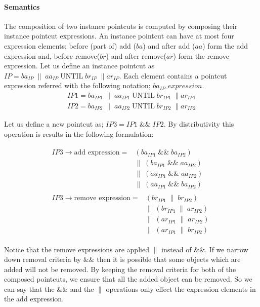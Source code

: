 \documentclass{llncs}
\begin{document}
\paragraph{Semantics}
The composition of two instance pointcuts is computed by composing their instance pointcut expressions.
An instance pointcut can have at most four expression elements; before (part of) add ($ba$) and after add ($aa$) form the add expression and, before remove($br$) and after remove($ar$) form the remove expression. Let us define an instance pointcut as $IP = ba_{IP}\;\|\;aa_{IP}\;\textrm{UNTIL}\;br_{IP}\;\| ar_{IP}$. Each element contains a pointcut expression referred with the following notation; $ba_{IP}\_expression$. 
\begin{align}
	IP1 = ba_{IP1}\;\|\;aa_{IP1}\;\textrm{UNTIL}\;br_{IP1}\;\| ar_{IP1} 
\label{i1}	\\
	IP2 = ba_{IP2}\;\|\;aa_{IP2}\;\textrm{UNTIL}\;br_{IP2}\;\| ar_{IP2}
\label{i2}
\end{align}

Let us define a new pointcut as; $IP3 = IP1\;\textrm{\&\&}\;IP2$. By distributivity this operation is results in the following formulation:

\begin{align}
\begin{split}
IP3 \rightarrow \textrm{add expression} =& \left( ba_{IP1}\;\textrm{\&\&}\;ba_{IP2}\right)\;\\ 
							&\|\;\left( ba_{IP1}\;\textrm{\&\&}\;aa_{IP2} \right)\;\\
&\|\;\left( aa_{IP1}\;\textrm{\&\&}\;aa_{IP2} \right)\;\\
&\|\;\left( aa_{IP1}\;\textrm{\&\&}\;ba_{IP2} \right) 
\label{i3add}
\end{split}
\\
\begin{split}
IP3 \rightarrow \textrm{remove expression}  =& \left( br_{IP1}\;\|\;br_{IP2}\right)\; \\
&\|\;\left( br_{IP1}\;\|\;ar_{IP2} \right)\;\\
&\|\;\left( ar_{IP1}\;\|\;ar_{IP2} \right)\;\\
&\|\;\left( ar_{IP1}\;\|\;br_{IP2} \right) 
\label{i3remove}
\end{split}
\end{align}

Notice that the remove expressions are applied $\|$ instead of \&\&. If we narrow down removal criteria by \&\& then it is possible that some objects which are added will not be removed. By keeping the removal criteria for both of the composed pointcuts, we ensure that all the added object can be removed. So we can say that the \&\& and the $\|$ operations only effect the expression elements in the add expression.
\end{document}
